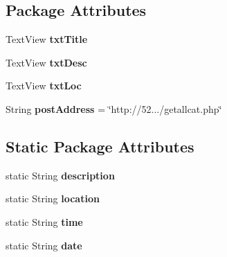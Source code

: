 \subsection*{\-Package \-Attributes}
\begin{DoxyCompactItemize}
\item 
\hypertarget{classcom_1_1example_1_1sel_1_1lostfound_1_1PostFragment_a273b76da45350a34e1e2fa02b9d6f6db}{\-Text\-View {\bfseries txt\-Title}}\label{classcom_1_1example_1_1sel_1_1lostfound_1_1PostFragment_a273b76da45350a34e1e2fa02b9d6f6db}

\item 
\hypertarget{classcom_1_1example_1_1sel_1_1lostfound_1_1PostFragment_af19ec2e8119f96d9f6de337f643c4ff6}{\-Text\-View {\bfseries txt\-Desc}}\label{classcom_1_1example_1_1sel_1_1lostfound_1_1PostFragment_af19ec2e8119f96d9f6de337f643c4ff6}

\item 
\hypertarget{classcom_1_1example_1_1sel_1_1lostfound_1_1PostFragment_a46b9bddf221f741a2e05b1fdb0334f10}{\-Text\-View {\bfseries txt\-Loc}}\label{classcom_1_1example_1_1sel_1_1lostfound_1_1PostFragment_a46b9bddf221f741a2e05b1fdb0334f10}

\item 
\hypertarget{classcom_1_1example_1_1sel_1_1lostfound_1_1PostFragment_a379b6033757082f79dd454aefc0ded0f}{\-String {\bfseries post\-Address} = \char`\"{}http\-://52.../getallcat.\-php\char`\"{}}\label{classcom_1_1example_1_1sel_1_1lostfound_1_1PostFragment_a379b6033757082f79dd454aefc0ded0f}

\end{DoxyCompactItemize}
\subsection*{\-Static \-Package \-Attributes}
\begin{DoxyCompactItemize}
\item 
\hypertarget{classcom_1_1example_1_1sel_1_1lostfound_1_1PostFragment_ab9c26a485846eb2c7c353939eb2f5674}{static \-String {\bfseries description}}\label{classcom_1_1example_1_1sel_1_1lostfound_1_1PostFragment_ab9c26a485846eb2c7c353939eb2f5674}

\item 
\hypertarget{classcom_1_1example_1_1sel_1_1lostfound_1_1PostFragment_aa71417aabbbacf85c296b9cbb189a05f}{static \-String {\bfseries location}}\label{classcom_1_1example_1_1sel_1_1lostfound_1_1PostFragment_aa71417aabbbacf85c296b9cbb189a05f}

\item 
\hypertarget{classcom_1_1example_1_1sel_1_1lostfound_1_1PostFragment_a74d19376fb2db9228d8379e1cfcd6722}{static \-String {\bfseries time}}\label{classcom_1_1example_1_1sel_1_1lostfound_1_1PostFragment_a74d19376fb2db9228d8379e1cfcd6722}

\item 
\hypertarget{classcom_1_1example_1_1sel_1_1lostfound_1_1PostFragment_a28ef8cb4afb2d99870de00a4c593a6eb}{static \-String {\bfseries date}}\label{classcom_1_1example_1_1sel_1_1lostfound_1_1PostFragment_a28ef8cb4afb2d99870de00a4c593a6eb}

\end{DoxyCompactItemize}


